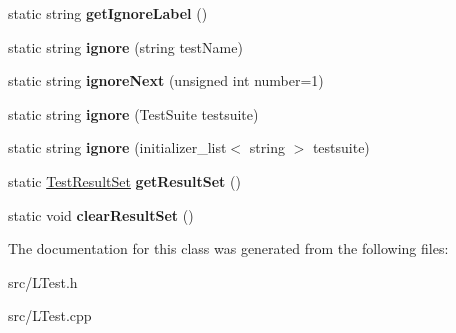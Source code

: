 \begin{DoxyCompactItemize}
\item 
\hypertarget{class_l_test_a599f9a46ee19339a837ca2edfe78ce82}{static string {\bfseries get\-Ignore\-Label} ()}\label{class_l_test_a599f9a46ee19339a837ca2edfe78ce82}

\item 
\hypertarget{class_l_test_a9c08362ba8f43a0cdc612bb553a00473}{static string {\bfseries ignore} (string test\-Name)}\label{class_l_test_a9c08362ba8f43a0cdc612bb553a00473}

\item 
\hypertarget{class_l_test_a81f661161b7d3258622af88b22cfa8fc}{static string {\bfseries ignore\-Next} (unsigned int number=1)}\label{class_l_test_a81f661161b7d3258622af88b22cfa8fc}

\item 
\hypertarget{class_l_test_a86cbeb497acc3fc5ff6e78c2db0dd644}{static string {\bfseries ignore} (Test\-Suite testsuite)}\label{class_l_test_a86cbeb497acc3fc5ff6e78c2db0dd644}

\item 
\hypertarget{class_l_test_ab4006e179fc2c20df7e55c85f12b142e}{static string {\bfseries ignore} (initializer\-\_\-list$<$ string $>$ testsuite)}\label{class_l_test_ab4006e179fc2c20df7e55c85f12b142e}

\item 
\hypertarget{class_l_test_a60b76a64df902355b4b16cddaf8f2995}{static \hyperlink{class_result_set_3_01_test_result_01_4}{Test\-Result\-Set} {\bfseries get\-Result\-Set} ()}\label{class_l_test_a60b76a64df902355b4b16cddaf8f2995}

\item 
\hypertarget{class_l_test_a565cd4d771557154e0cf605c76933f80}{static void {\bfseries clear\-Result\-Set} ()}\label{class_l_test_a565cd4d771557154e0cf605c76933f80}

\end{DoxyCompactItemize}


The documentation for this class was generated from the following files\-:\begin{DoxyCompactItemize}
\item 
src/L\-Test.\-h\item 
src/L\-Test.\-cpp\end{DoxyCompactItemize}
